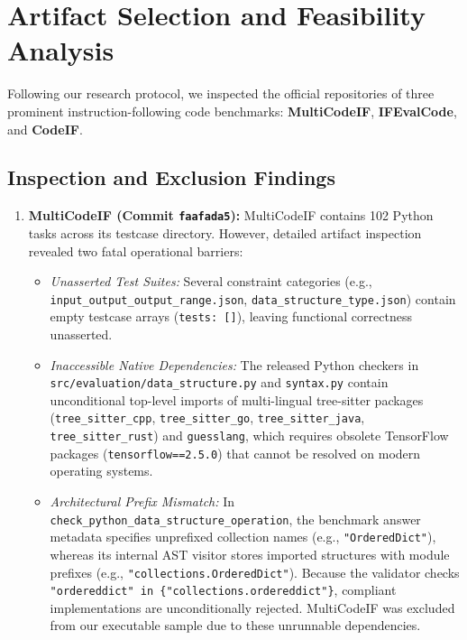 \documentclass[runningheads]{llncs}
\begin{document}
\section{Artifact Selection and Feasibility Analysis}
\label{sec:artifact_selection}

Following our research protocol, we inspected the official repositories of three prominent instruction-following code benchmarks: \textbf{MultiCodeIF}, \textbf{IFEvalCode}, and \textbf{CodeIF}.

\subsection{Inspection and Exclusion Findings}
\begin{enumerate}[leftmargin=*]
    \item \textbf{MultiCodeIF \cite{sysusel_multicodeif_2026} (Commit \texttt{faafada5}):} MultiCodeIF contains 102 Python tasks across its testcase directory. However, detailed artifact inspection revealed two fatal operational barriers:
    \begin{itemize}
        \item \emph{Unasserted Test Suites:} Several constraint categories (e.g., \texttt{input\_output\_output\_range.json}, \texttt{data\_structure\_type.json}) contain empty testcase arrays (\texttt{tests: []}), leaving functional correctness unasserted.
        \item \emph{Inaccessible Native Dependencies:} The released Python checkers in \texttt{src/evaluation/data\_structure.py} and \texttt{syntax.py} contain unconditional top-level imports of multi-lingual tree-sitter packages (\texttt{tree\_sitter\_cpp}, \texttt{tree\_sitter\_go}, \texttt{tree\_sitter\_java}, \texttt{tree\_sitter\_rust}) and \texttt{guesslang}, which requires obsolete TensorFlow packages (\texttt{tensorflow==2.5.0}) that cannot be resolved on modern operating systems.
        \item \emph{Architectural Prefix Mismatch:} In \texttt{check\_python\_data\_structure\_operation}, the benchmark answer metadata specifies unprefixed collection names (e.g., \texttt{"OrderedDict"}), whereas its internal AST visitor stores imported structures with module prefixes (e.g., \texttt{"collections.OrderedDict"}). Because the validator checks \texttt{"ordereddict" in \{"collections.ordereddict"\}}, compliant implementations are unconditionally rejected. MultiCodeIF was excluded from our executable sample due to these unrunnable dependencies.
    \end{itemize}

\end{enumerate}
\end{document}
